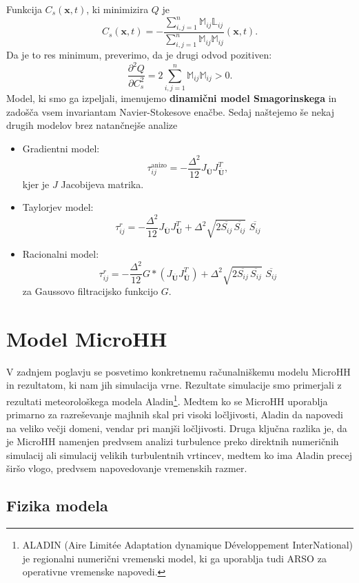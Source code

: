 \documentclass[mat2, tisk]{fmfdelo}
\newcommand{\bd}{\textbf}
\begin{document}
Funkcija $C_s(\bd{x}, t)$, ki minimizira $Q$ je 
\begin{equation}
C_s(\bd{x}, t) = - \frac{\sum_{i,j=1}^n \mathbb{M}_{ij} \mathbb{L}_{ij}}{\sum_{i,j=1}^n \mathbb{M}_{ij} \mathbb{M}_{ij}}(\bd{x}, t).
\end{equation}
Da je to res minimum, preverimo, da je drugi odvod pozitiven: 
$$
\frac{\partial^2 Q}{\partial C_s^2} = 2\sum_{i,j=1}^n \mathbb{M}_{ij} \mathbb{M}_{ij} > 0.
$$
Model, ki smo ga izpeljali, imenujemo \bd{dinamični model Smagorinskega} in zadošča vsem invariantam Navier-Stokesove enačbe.
Sedaj naštejemo še nekaj drugih modelov brez natančnejše analize 
\begin{itemize}
  \item Gradientni model:
  $$
  \tau_{ij}^\text{anizo} = -\frac{\Delta^2}{12} J_{\overline{\bd{U}}} J_{\overline{\bd{U}}}^T,
  $$
  kjer je $J$ Jacobijeva matrika.
  \item Taylorjev model:
  $$
  \tau_{ij}^r = -\frac{\Delta^2}{12} J_{\overline{\bd{U}}} J_{\overline{\bd{U}}}^T + \Delta^2 \sqrt{2\overline{S_{ij}}\,\overline{S_{ij}}}\,\, \overline{S_{ij}}
  $$
  \item Racionalni model:
  $$
  \tau_{ij}^r = -\frac{\Delta^2}{12} G*(J_{\overline{\bd{U}}} J_{\overline{\bd{U}}}^T) + \Delta^2 \sqrt{2\overline{S_{ij}}\,\overline{S_{ij}}}\,\, \overline{S_{ij}}
  $$
  za Gaussovo filtracijsko funkcijo $G$.
\end{itemize}

\section{Model MicroHH}

V zadnjem poglavju se posvetimo konkretnemu računalniškemu modelu 
MicroHH in rezultatom, ki nam jih simulacija vrne. Rezultate 
simulacije smo primerjali z rezultati 
meteorološkega modela Aladin\footnote{ALADIN (Aire Limitée Adaptation dynamique Développement InterNational) je regionalni numerični vremenski model, ki ga uporablja tudi ARSO za operativne vremenske napovedi.}. 
Medtem ko se MicroHH uporablja primarno za razreševanje majhnih skal pri visoki ločljivosti, 
Aladin da napovedi na veliko večji domeni, vendar pri manjši 
ločljivosti. Druga ključna razlika je, da je MicroHH namenjen 
predvsem analizi turbulence preko direktnih numeričnih 
simulacij ali simulacij velikih turbulentnih vrtincev, medtem 
ko ima Aladin precej širšo vlogo, predvsem napovedovanje vremenskih 
razmer.

\subsection{Fizika modela}
\end{document}
